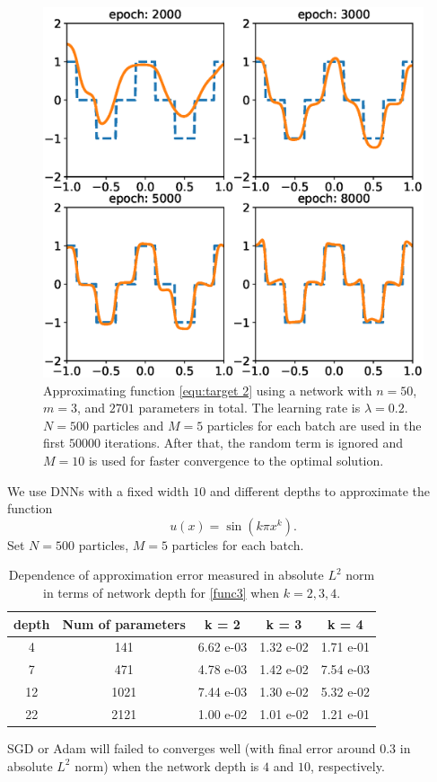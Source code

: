 \documentclass{beamer}
\begin{document}
\begin{frame}
\begin{figure}[ht]
	\centering
	\includegraphics[width=0.6\linewidth]{Figure/Fprinciple_exm2}
	\caption{Approximating function \eqref{equ:target 2} using a network with $n = 50$, $m = 3$, and $2701$ parameters in total. The learning rate is $\lambda=0.2$. $N = 500$ particles and $M=5$ particles for each batch are used in the first $50000$ iterations. After that, the random term is ignored and $M = 10$ is used for faster convergence to the optimal solution.}
	\label{fig:fprincipleexm2}
\end{figure}	
\end{frame}
\begin{frame}
 We use DNNs with a fixed width $10$ and different depths to approximate the function
\begin{equation}\label{func3}
	u(x) = \sin(k\pi x ^k).
\end{equation} 
Set $N = 500$ particles, $M = 5$ particles for each batch.
\begin{table}
	\centering
	\begin{tabular}{|c|c|c|c|c|}
	\hline
		 depth & Num of parameters & k = 2 &  k = 3 & k = 4  \\
		\hline
		4   & 141 & 6.62 e-03 & 1.32 e-02 & 1.71 e-01\\
		7   & 471 & 4.78 e-03 & 1.42 e-02 & 7.54 e-03\\
		12  & 1021 & 7.44 e-03 & 1.30 e-02 & 5.32 e-02\\
		22  & 2121 & 1.00 e-02 & 1.01 e-02 & 1.21 e-01\\
		\hline
	\end{tabular}
	\caption{Dependence of approximation error measured in absolute $L^2$ norm in terms of network depth for \eqref{func3} when $k=2, 3, 4$.}
	\label{tbl:depth vs accuracy}
\end{table}	

 SGD or Adam will failed to converges well (with final error around $0.3$ in absolute $L^2$ norm) when the network depth is $4$ and $10$, respectively.
\end{frame}
\end{document}
